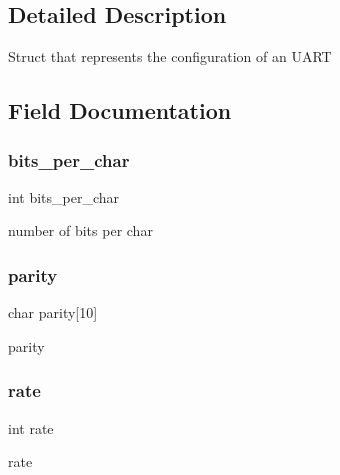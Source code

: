\subsection{Detailed Description}
Struct that represents the configuration of an U\+A\+RT 

\subsection{Field Documentation}
\hypertarget{structser__conf__t_a542331bcc7806df403a7210e40382b89}{}\label{structser__conf__t_a542331bcc7806df403a7210e40382b89} 
\subsubsection{\texorpdfstring{bits\+\_\+per\+\_\+char}{bits\_per\_char}}
{\footnotesize\ttfamily int bits\+\_\+per\+\_\+char}



number of bits per char 

\hypertarget{structser__conf__t_a0674046773a72bb7d71956cd58d393a9}{}\label{structser__conf__t_a0674046773a72bb7d71956cd58d393a9} 
\subsubsection{\texorpdfstring{parity}{parity}}
{\footnotesize\ttfamily char parity\mbox{[}10\mbox{]}}



parity 

\hypertarget{structser__conf__t_a7a829e6fd74e94e0edf10550470d844c}{}\label{structser__conf__t_a7a829e6fd74e94e0edf10550470d844c} 
\subsubsection{\texorpdfstring{rate}{rate}}
{\footnotesize\ttfamily int rate}



rate 

\hypertarget{structser__conf__t_a98c7ee45de40e6a45659762a1fb66830}{}\label{structser__conf__t_a98c7ee45de40e6a45659762a1fb66830} 
